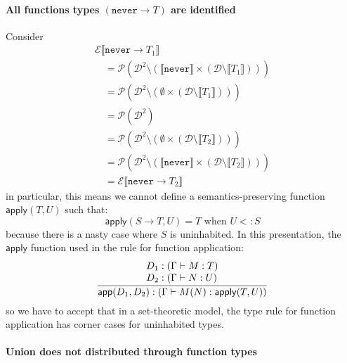 \documentclass[acmsmall,review,screen]{acmart}
\makeatletter
\newcommand{\infer}[2]{\frac{\displaystyle\begin{array}{@{}l@{}}#1\end{array}}{\displaystyle#2}}
\newcommand{\NEVER}{\mathtt{never}}
\newcommand{\APPLY}{\mathsf{apply}}
\newcommand{\APP}{\mathsf{app}}
\newcommand{\fun}{\mathbin{\rightarrow}}
\newcommand{\sem}[1]{\llbracket{#1}\rrbracket}
\newcommand{\Val}{\mathcal{D}}
\makeatother
\begin{document}
\paragraph{All functions types $(\NEVER \fun T)$ are identified}

Consider
  \[\begin{array}{l}
    \mathcal{E}\sem{\NEVER \fun T_1} \\\quad
     = \mathcal{P}(\Val^2 \setminus (\sem{\NEVER} \times (\Val \setminus \sem{T_1}))) \\\quad
     = \mathcal{P}(\Val^2 \setminus (\emptyset \times (\Val \setminus \sem{T_1}))) \\\quad
     = \mathcal{P}(\Val^2) \\\quad
     = \mathcal{P}(\Val^2 \setminus (\emptyset \times (\Val \setminus \sem{T_2}))) \\\quad
     = \mathcal{P}(\Val^2 \setminus (\sem{\NEVER} \times (\Val \setminus \sem{T_2}))) \\\quad
     = \mathcal{E}\sem{\NEVER \fun T_2}
  \end{array}\]
  in particular, this means we cannot define a semantics-preserving function
  $\APPLY(T, U)$ such that:
  \[
    \APPLY(S \fun T, U) = T \mbox{ when } U <: S
  \]
  because there is a nasty case where $S$ is uninhabited. In this presentation,
  the $\APPLY$ function used in the rule for function application:
  \[
    \infer{
      D_1 : (\Gamma \vdash M : T) \\
      D_2 : (\Gamma \vdash N : U)
    }{
      \APP(D_1, D_2) : (\Gamma \vdash M(N) : \APPLY(T,U))
    }
  \]
  so we have to accept that in a set-theoretic model, the type rule for function
  application has corner cases for uninhabited types.

\paragraph{Union does not distributed through function types}
  
\end{document}
